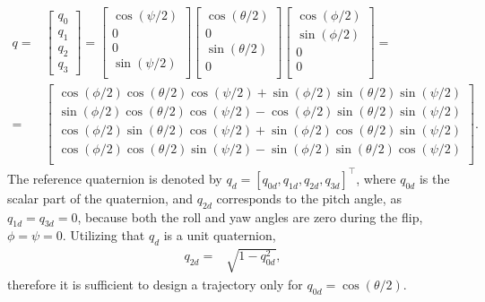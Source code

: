 \begin{equation}\label{eq:eul2quat}
\begin{split}
    q =&\begin{bmatrix} q_0\\q_1\\q_2\\q_3 \end{bmatrix}={\begin{bmatrix}\cos(\psi /2)\\0\\0\\\sin(\psi /2)\\\end{bmatrix}}{\begin{bmatrix}\cos(\theta /2)\\0\\\sin(\theta /2)\\0\\\end{bmatrix}}{\begin{bmatrix}\cos(\phi /2)\\\sin(\phi /2)\\0\\0\\\end{bmatrix}}=\\=&{\begin{bmatrix}\cos(\phi /2)\cos(\theta /2)\cos(\psi /2)+\sin(\phi /2)\sin(\theta /2)\sin(\psi /2)\\\sin(\phi /2)\cos(\theta /2)\cos(\psi /2)-\cos(\phi /2)\sin(\theta /2)\sin(\psi /2)\\\cos(\phi /2)\sin(\theta /2)\cos(\psi /2)+\sin(\phi /2)\cos(\theta /2)\sin(\psi /2)\\\cos(\phi /2)\cos(\theta /2)\sin(\psi /2)-\sin(\phi /2)\sin(\theta /2)\cos(\psi /2)\\\end{bmatrix}}.
\end{split}
\end{equation}
The reference quaternion is denoted by $q_d = [q_{0d}, q_{1d}, q_{2d}, q_{3d}]^\top$, where $q_{0d}$ is the scalar part of the quaternion, and $q_{2d}$ corresponds to the pitch angle, as $q_{1d}=q_{3d}=0$, because both the roll and yaw angles are zero during the flip, $\phi=\psi=0$. Utilizing that $q_d$ is a unit quaternion, 
\begin{align}
    q_{2d} = &\sqrt{1-q_{0d}^2},
\end{align}
therefore it is sufficient to design a trajectory only for $q_{0d}=\cos(\theta/2)$. 

